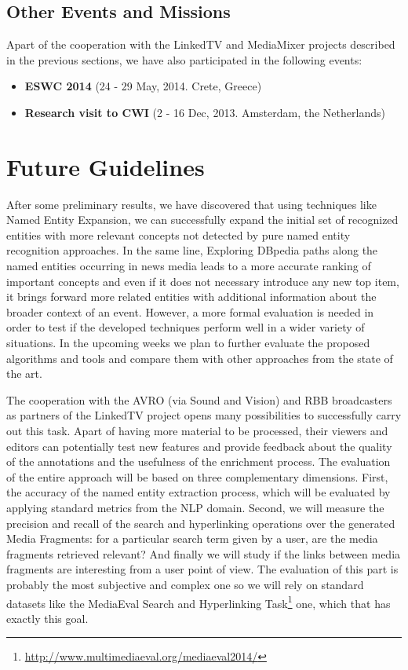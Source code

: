 \documentclass[a4paper,11pt]{report}
\begin{document}
\section*{Other Events and Missions}

Apart of the cooperation with the LinkedTV and MediaMixer projects described in the previous sections, we have also participated in the following events:

\begin{itemize}

\item   \textbf{ ESWC 2014 } (24 - 29 May, 2014. Crete, Greece)
\item   \textbf {Research visit to CWI} (2 - 16 Dec, 2013. Amsterdam, the Netherlands)

\end{itemize}




\chapter*{Future Guidelines}
\label{future}

After some preliminary results, we have discovered that using techniques like Named Entity Expansion, we can successfully expand the initial set of recognized entities with more relevant concepts not detected by pure named entity recognition approaches. In the same line, Exploring DBpedia paths along the named entities occurring in news media leads to a more accurate ranking of important concepts and even if it does not necessary introduce any new top item, it brings forward more related entities with additional information about the broader context of an event. However, a more formal evaluation is needed in order to test if the developed techniques perform well in a wider variety of situations. In the upcoming weeks we plan to further evaluate the proposed algorithms and tools and compare them with other approaches from the state of the art. 

The cooperation with the AVRO (via Sound and Vision) and RBB broadcasters as partners of the LinkedTV project opens many possibilities to successfully carry out this task. Apart of having more material to be processed, their viewers and editors can potentially test new features and provide feedback about the quality of the annotations and the usefulness of the enrichment process. The evaluation of the entire approach will be based on three complementary dimensions. First, the accuracy of the named entity extraction process, which will be evaluated by applying standard metrics from the NLP domain. Second, we will measure the precision and recall of the search and hyperlinking operations over the generated Media Fragments: for a particular search term given by a user, are the media fragments retrieved relevant? And finally we will study if the links between media fragments are interesting from a user point of view. The evaluation of this part is probably the most subjective and complex one so we will rely on standard datasets like the MediaEval Search and Hyperlinking Task\footnote{\url{http://www.multimediaeval.org/mediaeval2014/}} one, which that has exactly this goal.
\end{document}
